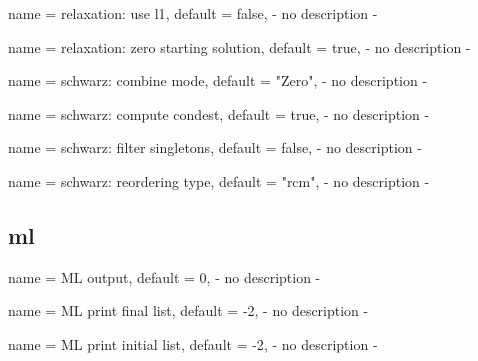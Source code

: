 \begin{parameter}{
    name    = {relaxation: use l1},
    default = {false},
}
- no description -
\end{parameter}

\begin{parameter}{
    name    = {relaxation: zero starting solution},
    default = {true},
}
- no description -
\end{parameter}

\begin{parameter}{
    name    = {schwarz: combine mode},
    default = {"Zero"},
}
- no description -
\end{parameter}

\begin{parameter}{
    name    = {schwarz: compute condest},
    default = {true},
}
- no description -
\end{parameter}

\begin{parameter}{
    name    = {schwarz: filter singletons},
    default = {false},
}
- no description -
\end{parameter}

\begin{parameter}{
    name    = {schwarz: reordering type},
    default = {"rcm"},
}
- no description -
\end{parameter}

\subsection{ml}

\begin{parameter}{
    name    = {ML output},
    default = {0},
}
- no description -
\end{parameter}

\begin{parameter}{
    name    = {ML print final list},
    default = {-2},
}
- no description -
\end{parameter}

\begin{parameter}{
    name    = {ML print initial list},
    default = {-2},
}
- no description -
\end{parameter}

